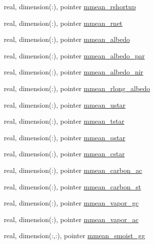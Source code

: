 \begin{DoxyCompactItemize}
\item 
real, dimension(\+:), pointer \hyperlink{structed__state__vars_1_1sitetype_a2f2f31044f1877b1ef9ae529d220b711}{mmean\+\_\+rshortup}
\item 
real, dimension(\+:), pointer \hyperlink{structed__state__vars_1_1sitetype_a60db98842c914e2dd2bc1702269196a6}{mmean\+\_\+rnet}
\item 
real, dimension(\+:), pointer \hyperlink{structed__state__vars_1_1sitetype_acea34a1a873f2b00d449d15adbe84196}{mmean\+\_\+albedo}
\item 
real, dimension(\+:), pointer \hyperlink{structed__state__vars_1_1sitetype_aa8c925e60e108be67b0963b152e928c3}{mmean\+\_\+albedo\+\_\+par}
\item 
real, dimension(\+:), pointer \hyperlink{structed__state__vars_1_1sitetype_a31e38532877a8e9cbad95adaad3ee81b}{mmean\+\_\+albedo\+\_\+nir}
\item 
real, dimension(\+:), pointer \hyperlink{structed__state__vars_1_1sitetype_a2ecce6237fcf046195b446dcf80e023b}{mmean\+\_\+rlong\+\_\+albedo}
\item 
real, dimension(\+:), pointer \hyperlink{structed__state__vars_1_1sitetype_ae8fa894e5cc207a0c4d180229ae15c8a}{mmean\+\_\+ustar}
\item 
real, dimension(\+:), pointer \hyperlink{structed__state__vars_1_1sitetype_aeb83ac5edfaae6a66e2b461adb897e8c}{mmean\+\_\+tstar}
\item 
real, dimension(\+:), pointer \hyperlink{structed__state__vars_1_1sitetype_a247e00ffd9dde49a3ef58951f3541bb5}{mmean\+\_\+qstar}
\item 
real, dimension(\+:), pointer \hyperlink{structed__state__vars_1_1sitetype_ab81ecc65d47ddc02629219b3c77a6bd9}{mmean\+\_\+cstar}
\item 
real, dimension(\+:), pointer \hyperlink{structed__state__vars_1_1sitetype_a8a97668081f1c0f22319f2f2eb3200df}{mmean\+\_\+carbon\+\_\+ac}
\item 
real, dimension(\+:), pointer \hyperlink{structed__state__vars_1_1sitetype_a41d1d344d52a452472449d3c0b51eaa2}{mmean\+\_\+carbon\+\_\+st}
\item 
real, dimension(\+:), pointer \hyperlink{structed__state__vars_1_1sitetype_a92705c34038339229f65b26371359395}{mmean\+\_\+vapor\+\_\+gc}
\item 
real, dimension(\+:), pointer \hyperlink{structed__state__vars_1_1sitetype_a79111f69fac801cabc9d076d4b1449b3}{mmean\+\_\+vapor\+\_\+ac}
\item 
real, dimension(\+:,\+:), pointer \hyperlink{structed__state__vars_1_1sitetype_a5aa222c19a53af0dcfd2d2581f412695}{mmean\+\_\+smoist\+\_\+gg}

\end{DoxyCompactItemize}
